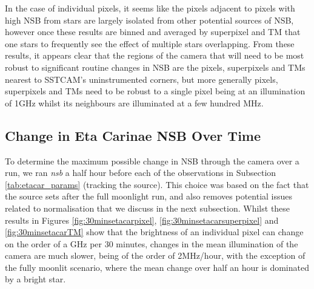 In the case of individual pixels, it seems like the pixels adjacent to pixels with high NSB from stars are largely isolated from other potential sources of NSB, however once these results are binned and averaged by superpixel and TM that one stars to frequently see the effect of multiple stars overlapping. From these results, it appears clear that the regions of the camera that will need to be most robust to significant routine changes in NSB are the pixels, superpixels and TMs nearest to SSTCAM's uninstrumented corners, but more generally pixels, superpixels and TMs need to be robust to a single pixel being at an illumination of 1GHz whilst its neighbours are illuminated at a few hundred MHz.

\subsection{Change in Eta Carinae NSB Over Time}
To determine the maximum possible change in NSB through the camera over a run, we ran \textit{nsb} a half hour before each of the observations in Subsection \ref{tab:etacar_params} (tracking the source). This choice was based on the fact that the source sets after the full moonlight run, and also removes potential issues related to normalisation that we discuss in the next subsection. Whilst these results in Figures \ref{fig:30minsetacarpixel}, \ref{fig:30minsetacarsuperpixel} and \ref{fig:30minsetacarTM} show that the brightness of an individual pixel can change on the order of a GHz per 30 minutes, changes in the mean illumination of the camera are much slower, being of the order of 2MHz/hour, with the exception of the fully moonlit scenario, where the mean change over half an hour is dominated by a bright star.



